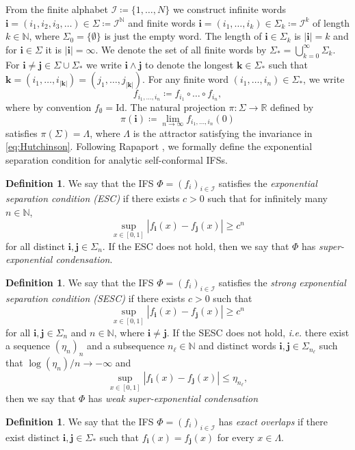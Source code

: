 \documentclass[11pt,a4paper]{article}
\def\cref#1{\ref{#1}}%
\theoremstyle{definition}
\newtheorem{definition}[theorem]{Definition}
\theoremstyle{remark}
\renewcommand{\Bbb}[1]{\mathbb{#1}}
\newcommand{\bbN}{{\Bbb N}}         %
\newcommand{\bbR}{{\Bbb R}}        %
\newcommand{\0}{\mathbf{0}}
\newcommand{\ie}{{\it i.e.}\/ }
\newcommand{\bi}{\mathbf{i}}
\newcommand{\bj}{\mathbf{j}}
\numberwithin{equation}{section}
\begin{document}
From the finite alphabet $\mathcal{I}\coloneqq\{1,\ldots,N\}$ we construct infinite words
$\bi=(i_1,i_2,i_3,\dots) \in\Sigma \coloneqq \mathcal{I}^{\bbN}$ and finite words
$\bi=(i_1,\ldots,i_k)\in \Sigma_k\coloneqq \mathcal{I}^k$ of length $k\in\mathbb{N}$, where
$\Sigma_0=\{\emptyset\}$ is just the empty word. The length of $\bi\in\Sigma_k$ is $|\bi|=k$ and for
$\bi\in\Sigma$ it is $|\bi|=\infty$. We denote the set of all finite words by $\Sigma_* =
\bigcup_{k=0}^\infty \Sigma_k$. For $\bi\neq\bj\in\Sigma\cup\Sigma_*$ we write $\bi\wedge\bj$
to denote the longest $\mathbf{k}\in\Sigma_*$ such that $\mathbf{k} = (i_1,\dots,
i_{|\mathbf{k}|})=(j_1,\dots,j_{|\mathbf{k}|})$.
For any finite word $(i_1,\dots,i_n)\in\Sigma_*$, we write
\[
f_{i_1,\dots,i_n}\coloneqq f_{i_1}\circ \dots \circ f_{i_n},
\]
where by convention $f_{\emptyset}=\mathrm{Id}$. The natural projection $\pi\colon\Sigma\to\bbR$ defined by
\begin{equation}\label{eq:natProj}
\pi(\bi)\coloneqq\lim_{n\to\infty}f_{i_1,\dots,i_n}(0)
\end{equation}
satisfies $\pi(\Sigma)=\Lambda$, where $\Lambda$ is the attractor satisfying the invariance in
\cref{eq:Hutchinson}. 
Following Rapaport \cite{Rapaport_SelfConfESC25arXiv}, we formally define the exponential separation
condition for analytic self-conformal IFSs.
\begin{definition}
  We say that the IFS $\Phi=(f_i)_{i\in\mathcal{I}}$ 
  satisfies the \emph{exponential separation condition (ESC)} if there exists $c>0$ such that for
  infinitely many $n\in\mathbb{N}$,
  \[
    \sup_{x\in[0,1]} |f_{\bi}(x)-f_{\bj}(x)| \geq c^n
  \]
  for all distinct $\bi,\bj\in\Sigma_n$. If the ESC does not hold,
  then we say that $\Phi$ has \emph{super-exponential condensation}.	
\end{definition}
\begin{definition}\label{def:SESC}
  We say that the IFS $\Phi=(f_i)_{i\in\mathcal{I}}$ 
  satisfies the \emph{strong exponential separation condition (SESC)} if there exists $c>0$ such that
  \[
    \sup_{x\in[0,1]} |f_{\bi}(x)-f_{\bj}(x)| \geq c^n
  \]
  for all $\bi,\bj\in\Sigma_n$ and $n\in\bbN$, where $\bi\neq\bj$. 
  If the SESC does not hold, \ie there exist a sequence $(\eta_n)_n$ and a subsequence
  $n_{\ell}\in\bbN$ and distinct words $\bi,\bj\in\Sigma_{n_\ell}$ such that
  $\log(\eta_n)/n\to-\infty$ and
  \[
    \sup_{x\in[0,1]}|f_{\bi}(x)-f_{\bj}(x)| \leq \eta_{n_\ell},
  \]
  then we say that $\Phi$ has \emph{weak super-exponential condensation}
\end{definition}
\begin{definition}
  We say that the IFS $\Phi=(f_i)_{i\in\mathcal{I}}$ 
 has \emph{exact overlaps} if there exist distinct $\bi,\bj\in\Sigma_*$ such that
 $f_{\bi}(x)=f_{\bj}(x)$ for every $x\in\Lambda$. 
\end{definition}
\end{document}
